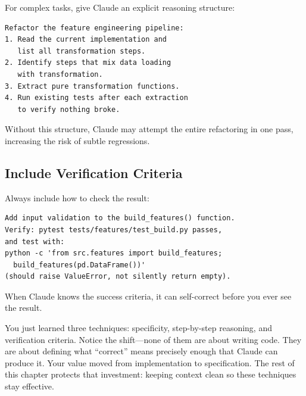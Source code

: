 
For complex tasks, give Claude an explicit reasoning structure:

\begin{verbatim}
Refactor the feature engineering pipeline:
1. Read the current implementation and
   list all transformation steps.
2. Identify steps that mix data loading
   with transformation.
3. Extract pure transformation functions.
4. Run existing tests after each extraction
   to verify nothing broke.
\end{verbatim}

Without this structure, Claude may attempt the entire refactoring
in one pass, increasing the risk of subtle regressions.

\subsection{Include Verification Criteria}


Always include how to check the result:

\begin{verbatim}
Add input validation to the build_features() function.
Verify: pytest tests/features/test_build.py passes,
and test with:
python -c 'from src.features import build_features;
  build_features(pd.DataFrame())'
(should raise ValueError, not silently return empty).
\end{verbatim}

When Claude knows the success criteria, it can self-correct
before you ever see the result.

\begin{whybox}
You just learned three techniques: specificity, step-by-step reasoning, and verification criteria. Notice the shift---none of them are about writing code. They are about defining what ``correct'' means precisely enough that Claude can produce it. Your value moved from implementation to specification. The rest of this chapter protects that investment: keeping context clean so these techniques stay effective.
\end{whybox}

